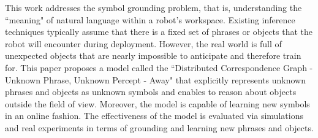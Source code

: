 This work addresses the symbol grounding problem, that is, understanding the ``meaning" of natural language within a robot's workspace. Existing inference techniques typically assume that there is a fixed set of phrases or objects that the robot will encounter during deployment. However, the real world is full of unexpected objects that are nearly impossible to anticipate and therefore train for. This paper proposes a model called the ``Distributed Correspondence Graph - Unknown Phrase, Unknown Percept - Away" that explicitly represents unknown phrases and objects as unknown symbols and enables to reason about objects outside the field of view. Moreover, the model is capable of learning new symbols in an online fashion. The effectiveness of the model is evaluated via simulations and real experiments in terms of grounding and learning new phrases and objects.



